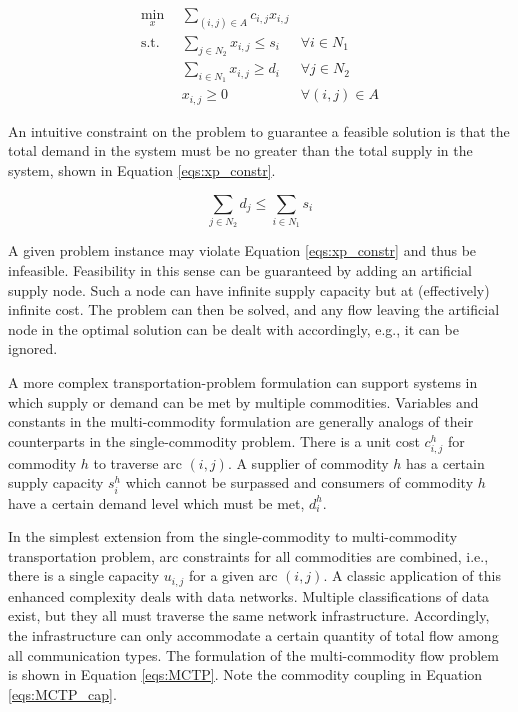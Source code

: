 \begin{subequations}\label{eqs:xport}
  \begin{align}
    \min_{x} \:\: & 
    \sum_{(i, j) \in A} c_{i,j} x_{i,j}
    & \label{eqs:xport_obj} \\
    \text{s.t.} \:\: &
    \sum_{j \in N_2} x_{i,j} \leq s_i
    & \forall i \in N_1  \\
    &
    \sum_{i \in N_1} x_{i,j} \geq d_i
    & \forall j \in N_2  \\
    &
    x_{i,j} \geq 0
    & \forall (i, j) \in A \label{eqs:xport_x}
  \end{align}
\end{subequations}

An intuitive constraint on the problem to guarantee a feasible solution is that
the total demand in the system must be no greater than the total supply in the
system, shown in Equation \ref{eqs:xp_constr}.

\begin{equation}\label{eqs:xp_constr}
  \sum_{j \in N_2} d_j \leq \sum_{i \in N_1} s_i
\end{equation}

\noindent
A given problem instance may violate Equation \ref{eqs:xp_constr} and thus be
infeasible. Feasibility in this sense can be guaranteed by adding an artificial
supply node. Such a node can have infinite supply capacity but at (effectively)
infinite cost. The problem can then be solved, and any flow leaving the
artificial node in the optimal solution can be dealt with accordingly, e.g., it
can be ignored.

A more complex transportation-problem formulation can support systems in which
supply or demand can be met by multiple commodities.  Variables and constants in
the multi-commodity formulation are generally analogs of their counterparts in
the single-commodity problem. There is a unit cost $c_{i,j}^{h}$ for commodity
$h$ to traverse arc $(i,j)$. A supplier of commodity $h$ has a certain supply
capacity $s_i^h$ which cannot be surpassed and consumers of commodity $h$ have a
certain demand level which must be met, $d_i^h$.

In the simplest extension from the single-commodity to multi-commodity
transportation problem, arc constraints for all commodities are combined, i.e.,
there is a single capacity $u_{i,j}$ for a given arc $(i, j)$. A classic
application of this enhanced complexity deals with data networks. Multiple
classifications of data exist, but they all must traverse the same network
infrastructure. Accordingly, the infrastructure can only accommodate a certain
quantity of total flow among all communication types. The formulation of the
multi-commodity flow problem is shown in Equation \ref{eqs:MCTP}. Note the
commodity coupling in Equation \ref{eqs:MCTP_cap}.

